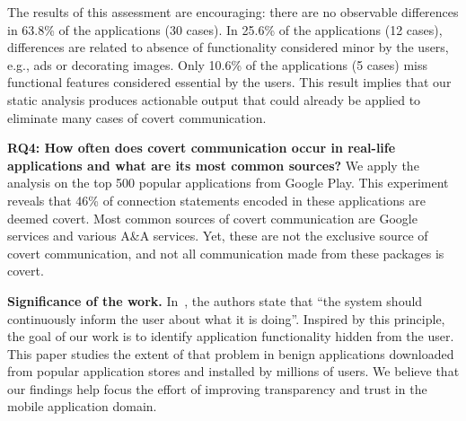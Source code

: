 The results of this  assessment are encouraging: there are no observable differences in 63.8\% of the applications (30 cases). In 25.6\% of the applications (12 cases), differences are related to absence of functionality considered minor by the users, e.g., ads or decorating images. Only 10.6\% of the applications (5 cases) miss functional features considered essential by the users. 
This result implies that our static analysis produces actionable output that could already be applied to eliminate many cases of covert communication. 


\noindent 
{\bf RQ4: How often does covert communication occur in real-life applications and what are its most common sources?}
We apply the analysis on the top 500 popular applications from Google Play. This experiment reveals that 46\% of connection statements encoded in these applications 
are deemed covert.
Most common sources of covert communication are Google services %
and various A\&A services. Yet, these are not the exclusive source of covert communication, and not all communication made from these packages is covert. 

%

\noindent 
{\bf Significance of the work.}  
In~\cite{Nielsen:Molich:CHI90,Blackmon:Polson:Kitajima:Lewis:CHI02,Ko:Zhang:CHI11}, the authors state that  
``the system should continuously inform the user about what it is doing''.
Inspired by this principle, the goal of our work is to identify 
application functionality hidden from the user.
This paper studies the extent of that problem in benign
applications downloaded from popular application stores
and installed by millions of users.
We believe that our findings help focus the effort of improving
transparency and trust in the mobile application domain. 


